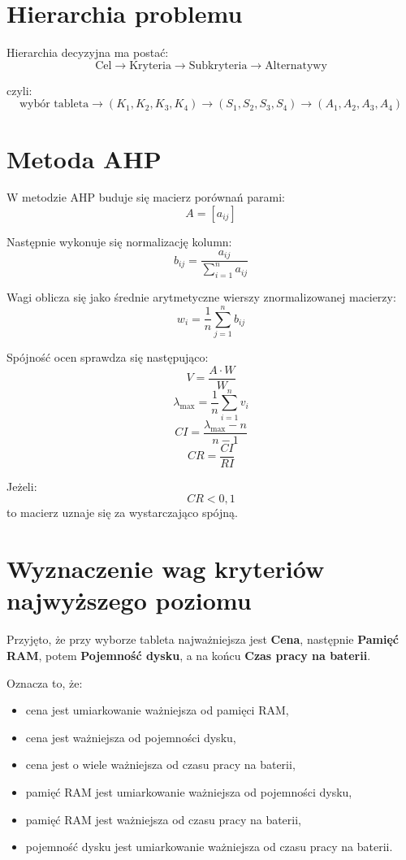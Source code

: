\documentclass[12pt,a4paper]{article}
\begin{document}
\section{Hierarchia problemu}

Hierarchia decyzyjna ma postać:
\[
\text{Cel} \rightarrow \text{Kryteria} \rightarrow \text{Subkryteria} \rightarrow \text{Alternatywy}
\]

czyli:
\[
\text{wybór tableta} \rightarrow (K_1,K_2,K_3,K_4) \rightarrow (S_1,S_2,S_3,S_4) \rightarrow (A_1,A_2,A_3,A_4)
\]

\section{Metoda AHP}

W metodzie AHP buduje się macierz porównań parami:
\[
A=[a_{ij}]
\]

Następnie wykonuje się normalizację kolumn:
\[
b_{ij}=\frac{a_{ij}}{\sum_{i=1}^{n} a_{ij}}
\]

Wagi oblicza się jako średnie arytmetyczne wierszy znormalizowanej macierzy:
\[
w_i=\frac{1}{n}\sum_{j=1}^{n} b_{ij}
\]

Spójność ocen sprawdza się następująco:
\[
V=\frac{A\cdot W}{W}
\]
\[
\lambda_{\max}=\frac{1}{n}\sum_{i=1}^{n} v_i
\]
\[
CI=\frac{\lambda_{\max}-n}{n-1}
\]
\[
CR=\frac{CI}{RI}
\]

Jeżeli:
\[
CR<0{,}1
\]
to macierz uznaje się za wystarczająco spójną.

\section{Wyznaczenie wag kryteriów najwyższego poziomu}

Przyjęto, że przy wyborze tableta najważniejsza jest \textbf{Cena}, następnie \textbf{Pamięć RAM}, potem \textbf{Pojemność dysku}, a na końcu \textbf{Czas pracy na baterii}.

Oznacza to, że:
\begin{itemize}
    \item cena jest umiarkowanie ważniejsza od pamięci RAM,
    \item cena jest ważniejsza od pojemności dysku,
    \item cena jest o wiele ważniejsza od czasu pracy na baterii,
    \item pamięć RAM jest umiarkowanie ważniejsza od pojemności dysku,
    \item pamięć RAM jest ważniejsza od czasu pracy na baterii,
    \item pojemność dysku jest umiarkowanie ważniejsza od czasu pracy na baterii.
\end{itemize}
\end{document}
